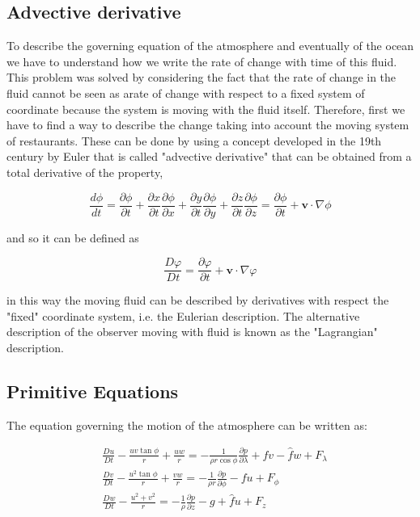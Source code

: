 \subsection{Advective derivative}\label{Sec:Adv}

To describe the governing equation of the atmosphere and eventually of
the ocean we have to understand how we write the rate of change with
time of this fluid. This problem was solved by considering the fact that
the rate of change in the fluid cannot be seen as arate of change with
respect to a fixed system of coordinate because the system is moving
with the fluid itself. Therefore, first we have to find a way to
describe the change taking into account the moving system of
restaurants. These can be done by using a concept developed in the 19th
century by Euler that is called "advective derivative" that can be
obtained from a total derivative of the property,

\[\frac{d \phi}{dt} = \frac{\partial \phi}{\partial t} + \frac{\partial x}{\partial t}\frac{\partial \phi}{\partial x} + \frac{\partial y}{\partial t}\frac{\partial \phi}{\partial y}+\frac{\partial z}{\partial t}\frac{\partial \phi}{\partial z} = \frac{\partial \phi}{\partial t} + \mathbf{v}\cdot\nabla\phi\]

and so it can be defined as

\[\frac{D \varphi}{Dt} =\frac{\partial \varphi}{\partial t} + \mathbf{v}\cdot\nabla\varphi\]

in this way the moving fluid can be described by derivatives with
respect the "fixed" coordinate system, i.e. the Eulerian description.
The alternative description of the observer moving with fluid is known
as the "Lagrangian" description.

\subsection{Primitive Equations}\label{Sec:Prim}

The equation governing the motion of the atmosphere can be written as:

\[\begin{aligned}
&\frac{D u}{Dt} -\frac{uv \tan{\phi}}{r} +  \frac{uw}{r} = -\frac{1}{\rho r \cos{\phi}}\frac{\partial p}{\partial \lambda} + fv - \hat{f}w + F_\lambda\\
&\frac{D v}{Dt} -\frac{u^2 \tan{\phi}}{r} +  \frac{vw}{r} = -\frac{1}{\rho r }\frac{\partial p}{\partial \phi} - fu  + F_\phi\\
&\frac{D w}{Dt} -\frac{u^2+v^2}{r} = -\frac{1}{\rho }\frac{\partial p}{\partial z} -g +\hat{f}u + F_z\\
\end{aligned}\]

